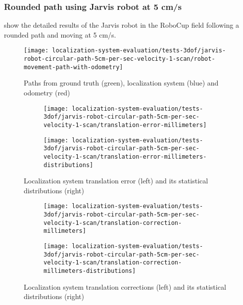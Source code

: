 \subsubsection{Rounded path using Jarvis robot at 5 cm/s}

 show the detailed results of the Jarvis robot in the RoboCup field following a rounded path and moving at 5 cm/s.

\begin{figure}[H]
	\centering
	\texttt{[image: localization-system-evaluation/tests-3dof/jarvis-robot-circular-path-5cm-per-sec-velocity-1-scan/robot-movement-path-with-odometry]}
	\caption{Paths from ground truth (green), localization system (blue) and odometry (red)}
	\label{fig:localization-system-evaluation_jarvis-robot-circular-path-5cm-per-sec-velocity-1-scan}
\end{figure}

\begin{figure}[H]
	\centering
	\begin{subfigure}[h]{.497\textwidth}
		\centering
		\texttt{[image: localization-system-evaluation/tests-3dof/jarvis-robot-circular-path-5cm-per-sec-velocity-1-scan/translation-error-millimeters]}
	\end{subfigure}
	\begin{subfigure}[h]{.497\textwidth}
		\centering
		\texttt{[image: localization-system-evaluation/tests-3dof/jarvis-robot-circular-path-5cm-per-sec-velocity-1-scan/translation-error-millimeters-distributions]}
	\end{subfigure}
	\caption{Localization system translation error (left) and its statistical distributions (right)}
	\label{fig:localization-system-evaluation_jarvis-robot-circular-path-5cm-per-sec-velocity-1-scan_translation-errors}
\end{figure}

\begin{figure}[H]
	\centering
	\begin{subfigure}[h]{.497\textwidth}
		\centering
		\texttt{[image: localization-system-evaluation/tests-3dof/jarvis-robot-circular-path-5cm-per-sec-velocity-1-scan/translation-correction-millimeters]}
	\end{subfigure}
	\begin{subfigure}[h]{.497\textwidth}
		\centering
		\texttt{[image: localization-system-evaluation/tests-3dof/jarvis-robot-circular-path-5cm-per-sec-velocity-1-scan/translation-correction-millimeters-distributions]}
	\end{subfigure}
	\caption{Localization system translation corrections (left) and its statistical distributions (right)}
	\label{fig:localization-system-evaluation_jarvis-robot-circular-path-5cm-per-sec-velocity-1-scan_translation-errors-corrections}
\end{figure}


